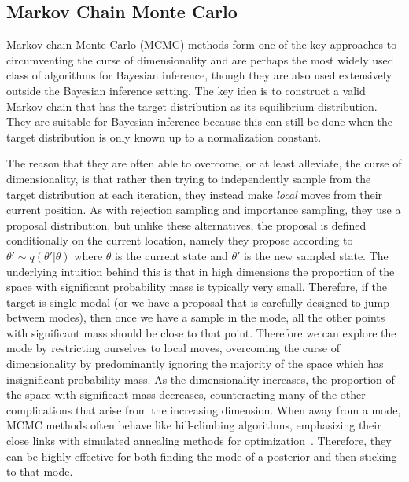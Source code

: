 
\subsection{Markov Chain Monte Carlo}
\label{sec:inf:foundation:mcmc}

Markov chain Monte Carlo (MCMC) methods \citep{metropolis1953equation,hastings1970monte,gilks1995markov} 
form one of the key approaches to circumventing the curse of dimensionality
and are perhaps the most widely used class of algorithms for Bayesian inference, though they
are also used extensively outside the Bayesian inference setting.  The key idea is to construct
a valid Markov chain that has the target distribution as its equilibrium distribution.  They are suitable
for Bayesian inference because this can still be done when the target distribution is only known
up to a normalization constant.  

The reason that they are often able to overcome, or at least alleviate,
the curse of dimensionality, is that rather then trying to independently sample from the target distribution
at each iteration, they instead make \emph{local} moves from their current position.  As with
rejection sampling and importance sampling, they use a proposal distribution, but unlike these
alternatives, the proposal is defined conditionally on the current location, namely they propose
according to $\theta' \sim q(\theta' | \theta)$ where $\theta$ is the current state and $\theta'$ is the new
sampled state.  The underlying intuition behind this is that in high dimensions the proportion of the
space with significant probability mass is typically very small.  Therefore, if the target is single modal (or
we have a proposal that is carefully designed to jump between modes), then once we have a sample
in the mode, all the other points with significant mass should be close to that point.  Therefore we can
explore the mode by restricting ourselves to local moves, overcoming the curse of dimensionality by
predominantly ignoring the majority of the space which has insignificant probability mass.  As the
dimensionality increases, the proportion of the space with significant mass decreases, counteracting
many of the other complications that arise from the increasing dimension.  When away from a mode,
MCMC methods often behave like hill-climbing algorithms, emphasizing their close links with simulated annealing
methods for optimization~\citep{aarts1988simulated}.  Therefore, they can be highly effective for both finding the mode
of a posterior and then sticking to that mode.

